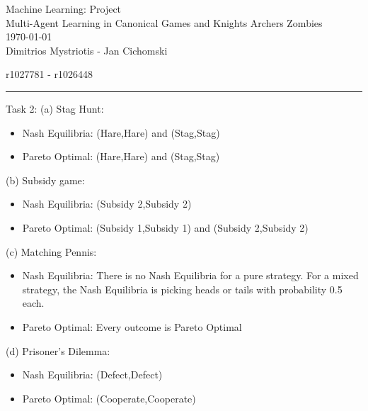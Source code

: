 \documentclass[12pt,letterpaper, onecolumn]{exam}
\begin{document}
\begingroup  
    \centering
    \LARGE Machine Learning: Project\\
    \LARGE Multi-Agent Learning in Canonical Games and Knights Archers Zombies\\[0.5em]
    \large \today\\[0.5em]
    \large Dimitrios Mystriotis - Jan Cichomski\par
    \large r1027781 - r1026448\par
\endgroup
\rule{\textwidth}{0.4pt}
\pointsdroppedatright   %
\printanswers
\renewcommand{\solutiontitle}{\noindent\textbf{Ans:}\enspace}   %


    


Task 2:
(a) Stag Hunt:
\begin{itemize}
    \item Nash Equilibria: (Hare,Hare) and (Stag,Stag)
    \item Pareto Optimal: (Hare,Hare) and (Stag,Stag)
\end{itemize}
(b) Subsidy game:
\begin{itemize}
    \item Nash Equilibria: (Subsidy 2,Subsidy 2)
    \item Pareto Optimal: (Subsidy 1,Subsidy 1) and (Subsidy 2,Subsidy 2)
\end{itemize}
(c) Matching Pennis:
\begin{itemize}
    \item Nash Equilibria: There is no Nash Equilibria for a pure strategy. For a mixed strategy, the Nash Equilibria is picking heads or tails with probability 0.5 each.
    \item Pareto Optimal: Every outcome is Pareto Optimal
\end{itemize}
(d) Prisoner's Dilemma:
\begin{itemize}
    \item Nash Equilibria: (Defect,Defect)
    \item Pareto Optimal: (Cooperate,Cooperate)
\end{itemize}
\end{document}
